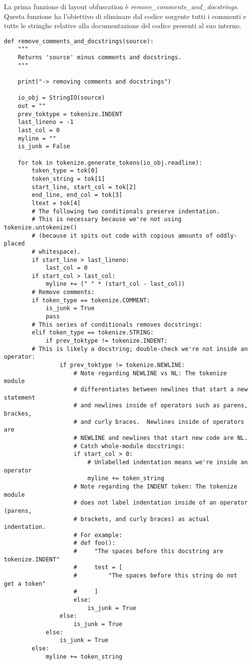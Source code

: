 \documentclass[a4paper,oneside,openright,titlepage,10pt,footinclude,headinclude]{scrbook}
\begin{document}
La prima funzione di layout obfuscation è \emph{remove\_comments\_and\_docstrings}.
Questa funzione ha l'obiettivo di eliminare dal codice sorgente tutti i commenti  e tutte le stringhe relative alla documentazione del codice presenti al suo interno.
\begin{graybox}[innerleftmargin=2,]
\begin{lstlisting}
def remove_comments_and_docstrings(source):
    """
    Returns 'source' minus comments and docstrings.
    """

    print("-> removing comments and docstrings")

    io_obj = StringIO(source)
    out = ""
    prev_toktype = tokenize.INDENT
    last_lineno = -1
    last_col = 0
    myline = ""
    is_junk = False

    for tok in tokenize.generate_tokens(io_obj.readline):
        token_type = tok[0]
        token_string = tok[1]
        start_line, start_col = tok[2]
        end_line, end_col = tok[3]
        ltext = tok[4]
        # The following two conditionals preserve indentation.
        # This is necessary because we're not using tokenize.untokenize()
        # (because it spits out code with copious amounts of oddly-placed
        # whitespace).
        if start_line > last_lineno:
            last_col = 0
        if start_col > last_col:
            myline += (" " * (start_col - last_col))
        # Remove comments:
        if token_type == tokenize.COMMENT:
            is_junk = True
            pass
        # This series of conditionals removes docstrings:
        elif token_type == tokenize.STRING:
            if prev_toktype != tokenize.INDENT:
        # This is likely a docstring; double-check we're not inside an operator:
                if prev_toktype != tokenize.NEWLINE:
                    # Note regarding NEWLINE vs NL: The tokenize module
                    # differentiates between newlines that start a new statement
                    # and newlines inside of operators such as parens, brackes,
                    # and curly braces.  Newlines inside of operators are
                    # NEWLINE and newlines that start new code are NL.
                    # Catch whole-module docstrings:
                    if start_col > 0:
                        # Unlabelled indentation means we're inside an operator
                        myline += token_string
                    # Note regarding the INDENT token: The tokenize module 
                    # does not label indentation inside of an operator (parens,
                    # brackets, and curly braces) as actual indentation.
                    # For example:
                    # def foo():
                    #     "The spaces before this docstring are tokenize.INDENT"
                    #     test = [
                    #         "The spaces before this string do not get a token"
                    #     ]
                    else:
                        is_junk = True
                else:
                    is_junk = True
            else:
                is_junk = True
        else:
            myline += token_string


\end{lstlisting}
\end{graybox}
\end{document}
